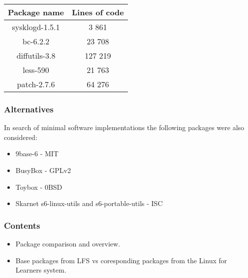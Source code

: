 \begin{center}
    \begin{tabular}{|c||c|}
        \hline
        Package name & Lines of code \\
        \hline
        \hline
        sysklogd-1.5.1 & 3 861 \\
        \hline
        bc-6.2.2 & 23 708 \\
        \hline        
        diffutils-3.8 & 127 219 \\
        \hline
        less-590 & 21 763 \\
        \hline
        patch-2.7.6 & 64 276 \\
        \hline
    \end{tabular}
\end{center}

\subsubsection{Alternatives}

In search of minimal software implementations the following packages were also considered:

\begin{itemize}
    \item 9base-6 \cite{9base} - MIT
    \item BusyBox \cite{busybox} - GPLv2
    \item Toybox \cite{toybox} - 0BSD
    \item Skarnet s6-linux-utils \cite{s6-linux} and s6-portable-utils \cite{s6-portable} - ISC
\end{itemize}

\subsubsection{Contents}

\begin{itemize}
    \item Package comparison and overview.
    \item Base packages from LFS vs coresponding packages from the Linux for Learners system.
\end{itemize}
